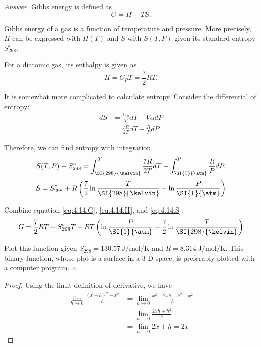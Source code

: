 \documentclass[12pt,oneside]{amsart}
\theoremstyle{definition}
\theoremstyle{remark}
\numberwithin{equation}{exer}
\newenvironment{answer}{\bigskip\noindent\emph{Answer.}}{\hfill$\diamond$\newline}
\begin{document}
\begin{answer}
    Gibbs energy is defined as
    \begin{equation}
        G = H - TS. \label{eq:4.14.G}
    \end{equation}

    Gibbs energy of a gas is a function of temperature and pressure.  More
    precisely, $H$ can be expressed with $H(T)$ and $S$ with $S(T, P)$ given
    its standard entropy $S_{298}^\circ$.

    For a diatomic gas, its enthalpy is given as
    \begin{equation}
        H = C_P T = \frac72 RT. \label{eq:4.14.H}
    \end{equation}

    It is somewhat more complicated to calculate entropy.  Consider the
    differential of entropy:
    \begin{align*}
        dS &= \frac{C_P}{T} dT - V\alpha dP \\
        &= \frac{7R}{2T} dT - \frac{R}{P} dP.
    \end{align*}

    Therefore, we can find entropy with integration.
    \[ S(T, P) - S_{298}^\circ = \int_{\SI{298}{\kelvin}}^T \frac{7R}{2T} dT - \int_{\SI{1}{\atm}}^P \frac{R}{P} dP.\]
    \begin{equation}
        S = S_{298}^\circ + R \left( \frac72 \ln\frac{T}{\SI{298}{\kelvin}} - \ln\frac{P}{\SI{1}{\atm}} \right)
        \label{eq:4.14.S}
    \end{equation}

    Combine equation \eqref{eq:4.14.G}, \eqref{eq:4.14.H}, and
    \eqref{eq:4.14.S}:
    \[ G = \frac72 RT - S_{298}^\circ T + RT \left( \ln\frac{P}{\SI{1}{\atm}} - \frac72 \ln\frac{T}{\SI{298}{\kelvin}} \right) \]

    Plot this function given $S_{298}^\circ = \SI{130.57}{\joule\per\mol\per\kelvin}$
    and $R = \SI{8.314}{\joule\per\mol\per\kelvin}$.  This binary function,
    whose plot is a surface in a 3-D space, is preferably plotted with a
    computer program.
\end{answer}








\begin{proof}

Using the limit definition of derivative, we have
\begin{equation*} \label{eq1}
\begin{split}
 \lim_{h \to 0} \frac{(x+h)^2 - x^2}{h}
    &= \lim_{h \to 0} \frac{x^2 + 2xh + h^2- x^2}{h}\\
    &= \lim_{h \to 0}\frac{2xh + h^2}{h}\\
    &= \lim_{h \to 0}2x + h = 2x
\end{split}
\end{equation*}




  

\end{proof}
\end{document}
